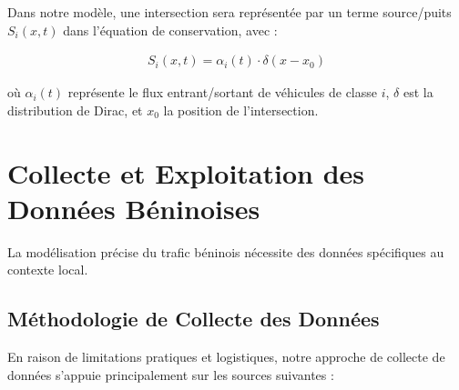 \begin{theorem}
Dans notre modèle, une intersection sera représentée par un terme source/puits $S_i(x,t)$ dans l'équation de conservation, avec :

\begin{align}
S_i (x,t) = \alpha_i (t) \cdot \delta(x-x_0)
\end{align}

où $\alpha_i(t)$ représente le flux entrant/sortant de véhicules de classe $i$, $\delta$ est la distribution de Dirac, et $x_0$ la position de l'intersection.
\end{theorem}

\section{Collecte et Exploitation des Données Béninoises}
\label{sec:collecte_donnees}

La modélisation précise du trafic béninois nécessite des données spécifiques au contexte local.

\subsection{Méthodologie de Collecte des Données}
\label{subsec:methodologie_collecte}

En raison de limitations pratiques et logistiques, notre approche de collecte de données s'appuie principalement sur les sources suivantes :

